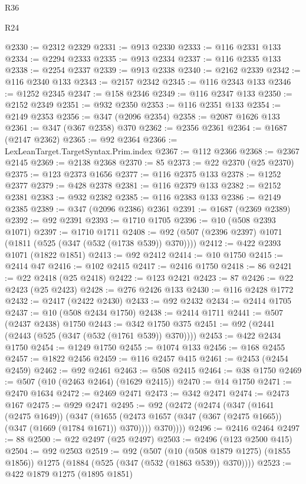 \begin{lexlean}{R36}
\begin{lexlean}{R24}
\begin{coremodule}
{{{{{{{{{{{{{{{{{{{{{{{{{{{{{{{{{{{{{{{{{{{{{{{{{{{{{{{{{{{{{{{{{{{{{{{{{{{{{{{{{{{{{{{{{{{{{{{{{{{{{{{{{{{{{{{{{{{{{{{{{{{{{{{{{{{{{{{{{{{{{{{{{{{{{{{{{{{{{{{{{{{{{{{{{{{{{{{{{{{{{{{{{{{{{{{{{{{@2330 := @2312 @2329
@2331 := @913 @2330
@2333 := @116 @2331 @133
@2334 := @2294 @2333
@2335 := @913 @2334
@2337 := @116 @2335 @133
@2338 := @2254 @2337
@2339 := @913 @2338
@2340 := @2162 @2339
@2342 := @116 @2340 @133
@2343 := @2157 @2342
@2345 := @116 @2343 @133
@2346 := @1252 @2345
@2347 := @158 @2346
@2349 := @116 @2347 @133
@2350 := @2152 @2349
@2351 := @932 @2350
@2353 := @116 @2351 @133
@2354 := @2149 @2353
@2356 := @347 (@2096 @2354)
@2358 := @2087 @1626 @133
@2361 := @347 (@367 @2358) @370
@2362 := @2356 @2361
@2364 := @1687 (@2147 @2362)
@2365 := @92 @2364
@2366 := LexLeanTarget.TargetSyntax.Prim.index
@2367 := @112 @2366
@2368 := @2367 @2145
@2369 := @2138 @2368
@2370 := 85
@2373 := @22 @2370 (@25 @2370)
@2375 := @123 @2373 @1656
@2377 := @116 @2375 @133
@2378 := @1252 @2377
@2379 := @428 @2378
@2381 := @116 @2379 @133
@2382 := @2152 @2381
@2383 := @932 @2382
@2385 := @116 @2383 @133
@2386 := @2149 @2385
@2389 := @347 (@2096 @2386) @2361
@2391 := @1687 (@2369 @2389)
@2392 := @92 @2391
@2393 := @1710 @1705
@2396 := @10 (@508 @2393 @1071)
@2397 := @1710 @1711
@2408 := @92 (@507 (@2396 @2397) @1071 (@1811 (@525 (@347 (@532 (@1738 @539)) @370))))
@2412 := @422 @2393 @1071 (@1822 @1851)
@2413 := @92 @2412
@2414 := @10 @1750
@2415 := @2414 @47
@2416 := @102 @2415
@2417 := @2416 @1750
@2418 := 86
@2421 := @22 @2418 (@25 @2418)
@2422 := @123 @2421
@2423 := 87
@2426 := @22 @2423 (@25 @2423)
@2428 := @276 @2426 @133
@2430 := @116 @2428 @1772
@2432 := @2417 (@2422 @2430)
@2433 := @92 @2432
@2434 := @2414 @1705
@2437 := @10 (@508 @2434 @1750)
@2438 := @2414 @1711
@2441 := @507 (@2437 @2438) @1750
@2443 := @342 @1750 @375
@2451 := @92 (@2441 (@2443 (@525 (@347 (@532 (@1761 @539)) @370))))
@2453 := @422 @2434 @1750
@2454 := @1249 @1750
@2455 := @1074 @133
@2456 := @168 @2455
@2457 := @1822 @2456
@2459 := @116 @2457 @415
@2461 := @2453 (@2454 @2459)
@2462 := @92 @2461
@2463 := @508 @2415
@2464 := @38 @1750
@2469 := @507 (@10 (@2463 @2464) (@1629 @2415))
@2470 := @14 @1750
@2471 := @2470 @1634
@2472 := @2469 @2471
@2473 := @342 @2471
@2474 := @2473 @167
@2475 := @929 @2471
@2495 := @92
    (@2472
      (@2474
        (@347
          (@1641 (@2475 @1649))
          (@347
            (@1655 (@2473 @1657 (@347 (@367 (@2475 @1665)) (@347 (@1669 (@1784 @1671)) @370))))
            @370))))
@2496 := @2416 @2464
@2497 := 88
@2500 := @22 @2497 (@25 @2497)
@2503 := @2496 (@123 @2500 @415)
@2504 := @92 @2503
@2519 := @92
    (@507
      (@10 (@508 @1879 @1275) (@1855 @1856))
      @1275
      (@1884 (@525 (@347 (@532 (@1863 @539)) @370))))
@2523 := @422 @1879 @1275 (@1895 @1851)
}}}}}}}}}}}}}}}}}}}}}}}}}}}}}}}}}}}}}}}}}}}}}}}}}}}}}}}}}}}}}}}}}}}}}}}}}}}}}}}}}}}}}}}}}}}}}}}}}}}}}}}}}}}}}}}}}}}}}}}}}}}}}}}}}}}}}}}}}}}}}}}}}}}}}}}}}}}}}}}}}}}}}}}}}}}}}}}}}}}}}}}}}}}}}}}}}}}
\end{coremodule}
\end{lexlean}
\end{lexlean}
